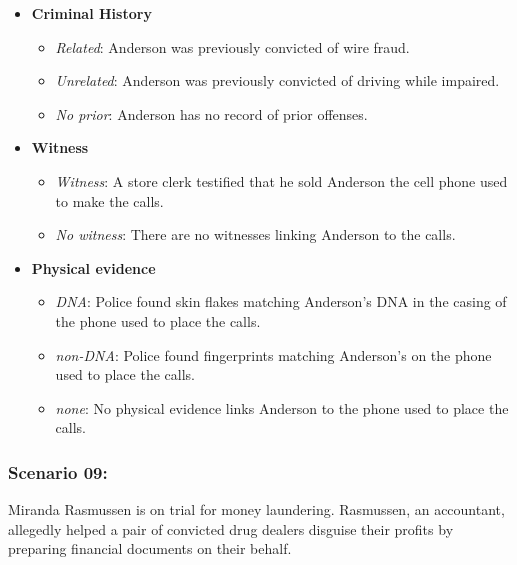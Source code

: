 \documentclass[
]{article}
\providecommand{\tightlist}{%
  \setlength{\itemsep}{0pt}\setlength{\parskip}{0pt}}
\begin{document}
\begin{itemize}
\tightlist
\item
  \textbf{Criminal History}

  \begin{itemize}
  \tightlist
  \item
    \emph{Related}: Anderson was previously convicted of wire fraud.
  \item
    \emph{Unrelated}: Anderson was previously convicted of driving while
    impaired.
  \item
    \emph{No prior}: Anderson has no record of prior offenses.
  \end{itemize}
\item
  \textbf{Witness}

  \begin{itemize}
  \tightlist
  \item
    \emph{Witness}: A store clerk testified that he sold Anderson the
    cell phone used to make the calls.
  \item
    \emph{No witness}: There are no witnesses linking Anderson to the
    calls.
  \end{itemize}
\item
  \textbf{Physical evidence}

  \begin{itemize}
  \tightlist
  \item
    \emph{DNA}: Police found skin flakes matching Anderson's DNA in the
    casing of the phone used to place the calls.
  \item
    \emph{non-DNA}: Police found fingerprints matching Anderson's on the
    phone used to place the calls.
  \item
    \emph{none}: No physical evidence links Anderson to the phone used
    to place the calls.
  \end{itemize}
\end{itemize}

\hypertarget{scenario-09}{%
\subsubsection{Scenario 09:}\label{scenario-09}}

Miranda Rasmussen is on trial for money laundering. Rasmussen, an
accountant, allegedly helped a pair of convicted drug dealers disguise
their profits by preparing financial documents on their behalf.
\end{document}
